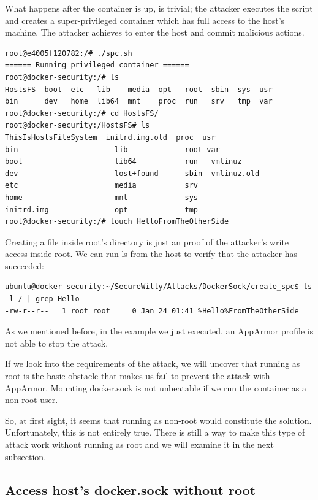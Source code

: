 What happens after the container is up, is trivial; the attacker executes the script and creates a super-privileged container which has full access to the host's machine. The attacker achieves to enter the host and commit malicious actions.

\begin{lstlisting}[style=terminal]
root@e4005f120782:/# ./spc.sh
====== Running privileged container ======
root@docker-security:/# ls
HostsFS  boot  etc   lib    media  opt   root  sbin  sys  usr
bin      dev   home  lib64  mnt    proc  run   srv   tmp  var
root@docker-security:/# cd HostsFS/
root@docker-security:/HostsFS# ls
ThisIsHostsFileSystem  initrd.img.old  proc  usr
bin                      lib             root var
boot                     lib64           run   vmlinuz
dev                      lost+found      sbin  vmlinuz.old
etc                      media           srv
home                     mnt             sys
initrd.img               opt             tmp
root@docker-security:/# touch HelloFromTheOtherSide
\end{lstlisting}

Creating a file inside root's directory is just an  proof of the attacker's write access inside root. We can run ls from the host to verify that the attacker has succeeded:

\begin{lstlisting}[style=terminal]
ubuntu@docker-security:~/SecureWilly/Attacks/DockerSock/create_spc$ ls -l / | grep Hello
-rw-r--r--   1 root root     0 Jan 24 01:41 %Hello%FromTheOtherSide
\end{lstlisting}

As we mentioned before, in the example we just executed, an AppArmor profile is not able to stop the attack. 

If we look into the requirements of the attack, we will uncover that running as root is the basic obstacle that makes us fail to prevent the attack with AppArmor. Mounting docker.sock is not unbeatable if we run the container as a non-root user.

So, at first sight, it seems that running as non-root would constitute the solution. Unfortunately, this is not entirely true. There is still a way to make this type of attack work without running as root and we will examine it in the next subsection.

\subsection{Access host's docker.sock without root} \label{accessnoroot}
